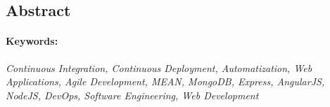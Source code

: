 \subsection*{Abstract}



\paragraph{Keywords:}
\textit{Continuous Integration, Continuous Deployment, Automatization, Web Applications, Agile Development, MEAN, MongoDB, Express, AngularJS, NodeJS, DevOps, Software Engineering, Web Development}
